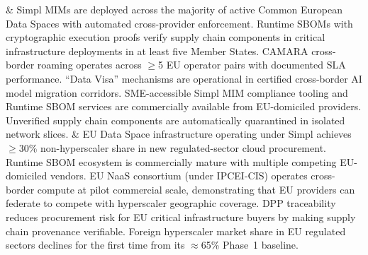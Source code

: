 \begin{landscape}
\begin{longtable}
&
Simpl MIMs are deployed across the majority of active Common European
Data Spaces with automated cross-provider enforcement. Runtime SBOMs
with cryptographic execution proofs verify supply chain components in
critical infrastructure deployments in at least five Member States.
CAMARA cross-border roaming operates across $\geq$5 EU operator pairs
with documented SLA performance. ``Data Visa'' mechanisms are
operational in certified cross-border AI model migration corridors.
SME-accessible Simpl MIM compliance tooling and Runtime SBOM services
are commercially available from EU-domiciled providers. Unverified
supply chain components are automatically quarantined in isolated
network slices.
&
EU Data Space infrastructure operating under Simpl achieves $\geq$30\%
non-hyperscaler share in new regulated-sector cloud procurement. Runtime
SBOM ecosystem is commercially mature with multiple competing EU-domiciled
vendors. EU NaaS consortium (under IPCEI-CIS) operates cross-border
compute at pilot commercial scale, demonstrating that EU providers
can federate to compete with hyperscaler geographic coverage. DPP
traceability reduces procurement risk for EU critical infrastructure
buyers by making supply chain provenance verifiable. Foreign hyperscaler
market share in EU regulated sectors declines for the first time from
its $\approx$65\% Phase~1 baseline.
\\
\hline


\end{longtable}
\end{landscape}
